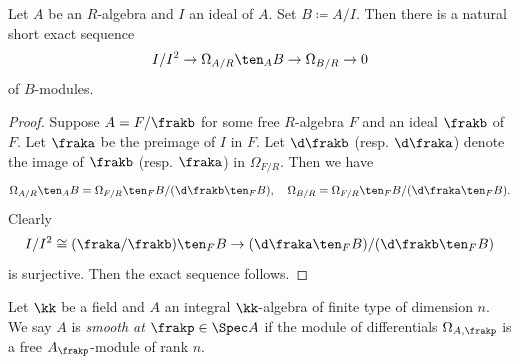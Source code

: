     \begin{theorem}\label{thm: the second exact sequence of differentials}
        Let \(A\) be an \(R\)-algebra and \(I\) an ideal of \(A\).
        Set \(B \coloneqq A/I\).
        Then there is a natural short exact sequence
        \[ I/I^2 \to \Omega_{A/R} \ten_A B \to \Omega_{B/R} \to 0 \]
        of \(B\)-modules.
    \end{theorem}
    \begin{proof}
        Suppose \(A = F/\frakb\) for some free \(R\)-algebra \(F\) and an ideal \(\frakb\) of \(F\).
        Let \(\fraka\) be the preimage of \(I\) in \(F\).
        Let \(\d \frakb\) (resp. \(\d \fraka\)) denote the image of \(\frakb\) (resp. \(\fraka\)) in \(\Omega_{F/R}\).
        Then we have 
        \[ \Omega_{A/R} \ten_A B = \Omega_{F/R} \ten_F B / (\d \frakb \ten_F B), \quad \Omega_{B/R} = \Omega_{F/R} \ten_F B / (\d \fraka \ten_F B). \]
        Clearly 
        \[ I/I^2 \cong (\fraka/\frakb)\ten_F B \to (\d \fraka \ten_F B)/(\d \frakb \ten_F B) \]
        is surjective.
        Then the exact sequence follows.
    \end{proof}

    \begin{definition}\label{def: smoothness of affine algebraic varieties}
        Let \(\kk\) be a field and \(A\) an integral \(\kk\)-algebra of finite type of dimension $n$.
        We say \(A\) is \emph{smooth at \(\frakp \in \Spec A\)} if the module of differentials \(\Omega_{A,\frakp}\) is a free \(A_\frakp\)-module of rank \(n\).
    \end{definition}

